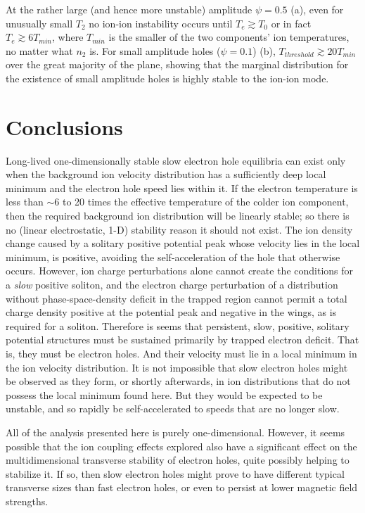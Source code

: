\documentclass[pre]{revtex4-2}
\begin{document}
At the rather large (and hence more
unstable) amplitude $\psi=0.5$ (a), even for unusually small $T_2$ no
ion-ion instability occurs until $T_e\gtrsim T_0$ or in fact
$T_e\gtrsim 6 T_{min}$, where $T_{min}$ is the smaller of the two
components' ion temperatures, no matter what $n_2$ is. For small
amplitude holes ($\psi=0.1$) (b), $T_{threshold}\gtrsim 20 T_{min}$
over the great majority of the plane, showing that the marginal
distribution for the existence of small amplitude holes is highly
stable to the ion-ion mode.

\section{Conclusions}

Long-lived one-dimensionally stable slow electron hole equilibria can
exist only when the background ion velocity distribution has a
sufficiently deep local minimum and the electron hole speed lies
within it. If the electron temperature is less than $\sim 6$ to 20
times the effective temperature of the colder ion component, then the
required background ion distribution will be linearly stable; so there
is no (linear electrostatic, 1-D) stability reason it should not
exist. The ion density change caused by a solitary positive potential
peak whose velocity lies in the local minimum, is positive, avoiding
the self-acceleration of the hole that otherwise occurs. However, ion
charge perturbations alone cannot create the conditions for a
\emph{slow} positive soliton, and the electron charge perturbation of
a distribution without phase-space-density deficit in the trapped
region cannot permit a total charge density positive at the potential
peak and negative in the wings, as is required for a
soliton. Therefore is seems that persistent, slow, positive, solitary
potential structures must be sustained primarily by trapped electron
deficit. That is, they must be electron holes. And their velocity must
lie in a local minimum in the ion velocity distribution. It is not
impossible that slow electron holes might be observed as they form, or
shortly afterwards, in ion distributions that do not possess the local
minimum found here. But they would be expected to be unstable, and so
rapidly be self-accelerated to speeds that are no longer slow.

All of the analysis presented here is purely one-dimensional. However,
it seems possible that the ion coupling effects explored also have a
significant effect on the multidimensional transverse stability of
electron holes, quite possibly helping to stabilize it. If so, then
slow electron holes might prove to have different typical transverse
sizes than fast electron holes, or even to persist at lower magnetic
field strengths. 
\end{document}
